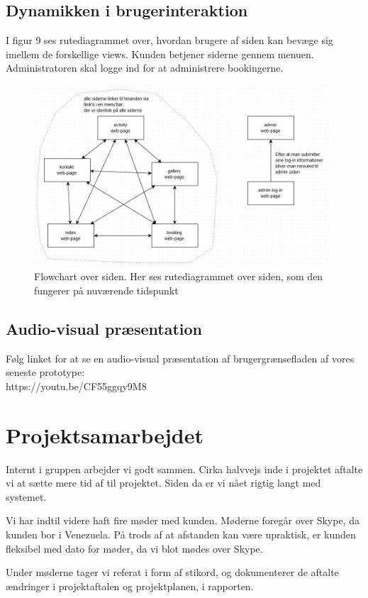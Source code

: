 \documentclass[12pt,a4paper]{article}
\begin{document}
\subsection{Dynamikken i brugerinteraktion}
I figur 9 ses rutediagrammet over, 
hvordan brugere af siden kan bevæge sig imellem de forskellige views. 
Kunden betjener siderne gennem menuen.
Administratoren skal logge ind for at administrere bookingerne.
\begin{figure}[H]
\centering
\includegraphics[scale=0.6] {flowchart.jpg}
\caption{Flowchart over siden. Her ses rutediagrammet over siden, som den fungerer på nuværende tidspunkt}
\end{figure}
\newpage
\subsection{Audio-visual præsentation}
Følg linket for at se en audio-visual præsentation af brugergrænsefladen af vores seneste prototype:\\
https://youtu.be/CF55ggqy9M8
\section{Projektsamarbejdet}
Internt i gruppen arbejder vi godt sammen. Cirka halvvejs inde i projektet aftalte vi at sætte mere tid af til projektet. Siden da er vi nået rigtig langt med systemet. 

Vi har indtil videre haft fire møder med kunden. Møderne foregår over Skype, da kunden bor i Venezuela. På trods af at afstanden kan være upraktisk, er kunden fleksibel med dato for møder, da vi blot mødes over Skype.

Under møderne tager vi referat i form af stikord, og dokumenterer de aftalte ændringer i projektaftalen og projektplanen, i rapporten. 
\end{document}
